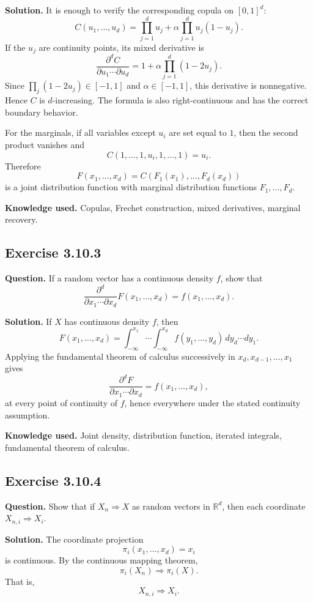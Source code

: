 \documentclass[11pt]{article}
\begin{document}
\textbf{Solution.}
It is enough to verify the corresponding copula on $[0,1]^d$:
\[
  C(u_1,\ldots,u_d)
  =
  \prod_{j=1}^d u_j
  +
  \alpha\prod_{j=1}^d u_j(1-u_j).
\]
If the $u_j$ are continuity points, its mixed derivative is
\[
  \frac{\partial^d C}{\partial u_1\cdots\partial u_d}
  =
  1+\alpha\prod_{j=1}^d(1-2u_j).
\]
Since $\prod_j(1-2u_j)\in[-1,1]$ and $\alpha\in[-1,1]$, this derivative
is nonnegative.  Hence $C$ is $d$-increasing.  The formula is also
right-continuous and has the correct boundary behavior.

For the marginals, if all variables except $u_i$ are set equal to $1$,
then the second product vanishes and
\[
  C(1,\ldots,1,u_i,1,\ldots,1)=u_i.
\]
Therefore
\[
  F(x_1,\ldots,x_d)=C(F_1(x_1),\ldots,F_d(x_d))
\]
is a joint distribution function with marginal distribution functions
$F_1,\ldots,F_d$.

\textbf{Knowledge used.}
Copulas, Frechet construction, mixed derivatives, marginal recovery.

\subsection*{Exercise 3.10.3}
\textbf{Question.}
If a random vector has a continuous density $f$, show that
\[
  \frac{\partial^d}{\partial x_1\cdots\partial x_d}
  F(x_1,\ldots,x_d)
  =
  f(x_1,\ldots,x_d).
\]

\textbf{Solution.}
If $X$ has continuous density $f$, then
\[
  F(x_1,\ldots,x_d)
  =
  \int_{-\infty}^{x_1}\cdots\int_{-\infty}^{x_d}
  f(y_1,\ldots,y_d)\,dy_d\cdots dy_1.
\]
Applying the fundamental theorem of calculus successively in
$x_d,x_{d-1},\ldots,x_1$ gives
\[
  \frac{\partial^d F}{\partial x_1\cdots\partial x_d}
  =
  f(x_1,\ldots,x_d),
\]
at every point of continuity of $f$, hence everywhere under the stated
continuity assumption.

\textbf{Knowledge used.}
Joint density, distribution function, iterated integrals, fundamental
theorem of calculus.

\subsection*{Exercise 3.10.4}
\textbf{Question.}
Show that if $X_n\Rightarrow X$ as random vectors in $\mathbb R^d$, then
each coordinate $X_{n,i}\Rightarrow X_i$.

\textbf{Solution.}
The coordinate projection
\[
  \pi_i(x_1,\ldots,x_d)=x_i
\]
is continuous.  By the continuous mapping theorem,
\[
  \pi_i(X_n)\Rightarrow \pi_i(X).
\]
That is,
\[
  X_{n,i}\Rightarrow X_i.
\]
\end{document}
